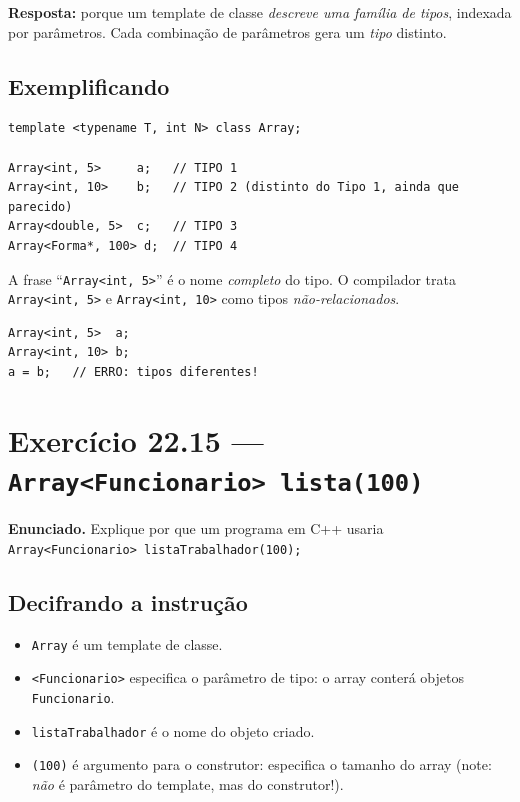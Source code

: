 \documentclass[11pt,a4paper]{article}
\begin{document}
\begin{resposta}\textbf{Resposta:} porque um template de classe \emph{descreve uma fam\'ilia de tipos}, indexada por par\^ametros. Cada combina\c{c}\~ao de par\^ametros gera um \emph{tipo} distinto.\end{resposta}

\subsection*{Exemplificando}

\begin{lstlisting}[style=cppcode,numbers=none]
template <typename T, int N> class Array;

Array<int, 5>     a;   // TIPO 1
Array<int, 10>    b;   // TIPO 2 (distinto do Tipo 1, ainda que parecido)
Array<double, 5>  c;   // TIPO 3
Array<Forma*, 100> d;  // TIPO 4
\end{lstlisting}

A frase ``\texttt{Array<int, 5>}'' \'e o nome \emph{completo} do tipo. O compilador trata \texttt{Array<int, 5>} e \texttt{Array<int, 10>} como tipos \emph{n\~ao-relacionados}.

\begin{lstlisting}[style=cppcode,numbers=none]
Array<int, 5>  a;
Array<int, 10> b;
a = b;   // ERRO: tipos diferentes!
\end{lstlisting}

\section{Exerc\'icio 22.15 --- \texttt{Array<Funcionario> lista(100)}}

\begin{enunciado}
\textbf{Enunciado.} Explique por que um programa em C++ usaria \texttt{Array<Funcionario> listaTrabalhador(100);}
\end{enunciado}

\subsection*{Decifrando a instru\c{c}\~ao}

\begin{itemize}[leftmargin=*,itemsep=0pt]
  \item \texttt{Array} \'e um template de classe.
  \item \texttt{<Funcionario>} especifica o par\^ametro de tipo: o array conter\'a objetos \texttt{Funcionario}.
  \item \texttt{listaTrabalhador} \'e o nome do objeto criado.
  \item \texttt{(100)} \'e argumento para o construtor: especifica o tamanho do array (note: \emph{n\~ao} \'e par\^ametro do template, mas do construtor!).
\end{itemize}
\end{document}

